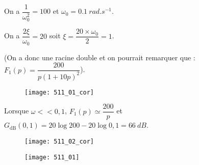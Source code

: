\normaltrue \difficilefalse \tdifficilefalse
\correctiontrue


\setcounter{question}{0}%
\ifcorrection
\else
{}
\fi


\ifprof 
\else
 \fi
 
\ifprof

On a $\dfrac{1}{\omega_0^2} = {100}$ et $\omega_0 = \SI{0,1}{rad.s^{-1}}$.

On a $\dfrac{2\xi}{\omega_0}= {20}$ soit $\xi = \dfrac{20\times \omega_0}{2 }= 1$.

(On a donc une racine double et on pourrait remarquer que : 
$F_1(p)=\dfrac{200}{p\left(1+10p\right)^2}$).

\begin{figure}[!h]
\texttt{[image: 511\_01\_cor]}
\end{figure}

Lorsque $\omega << 0,1$, $F_1(p) \simeq \dfrac{200}{p}$ et $G_{\text{dB}}(0,1) = 20\log 200 - 20 \log 0,1 = \SI{66}{dB}$.
\begin{figure}[!h]
\texttt{[image: 511\_02\_cor]}
\end{figure}

\else 
\begin{figure}[!h]
\texttt{[image: 511\_01]}
\end{figure}
\fi






 

\ifprof
\else


\fi